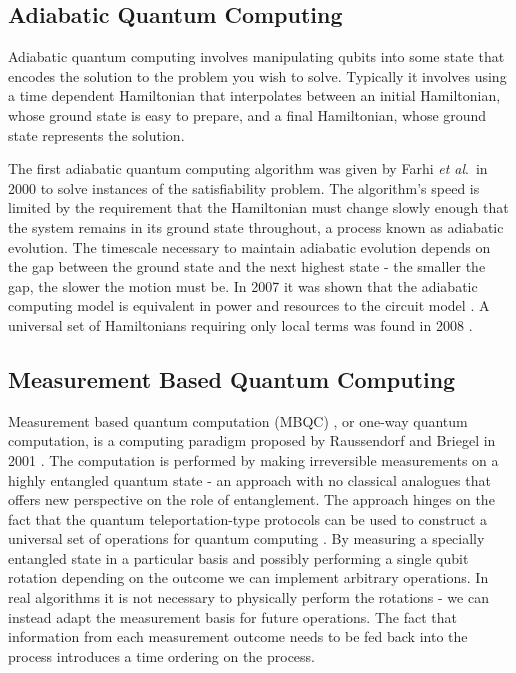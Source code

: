 \subsection{Adiabatic Quantum Computing}

Adiabatic quantum computing involves manipulating qubits into some state that encodes the solution to the problem you wish to solve. Typically it involves using a time dependent Hamiltonian that interpolates between an initial Hamiltonian, whose ground state is easy to prepare, and a final Hamiltonian, whose ground state represents the solution. 

The first adiabatic quantum computing algorithm was given by Farhi \textit{et al}.\ in 2000 \cite{adiabatic_qc} to solve instances of the satisfiability problem. The algorithm's speed is limited by the requirement that the Hamiltonian must change slowly enough that the system remains in its ground state throughout, a process known as adiabatic evolution. The timescale necessary to maintain adiabatic evolution depends on the gap between the ground state and the next highest state - the smaller the gap, the slower the motion must be. In 2007 it was shown that the adiabatic computing model is equivalent in power and resources to the circuit model \cite{adiabatic_equivalent}. A universal set of Hamiltonians requiring only local terms was found in 2008 \cite{hamiltonians_for_adiabatic_qc}.


\subsection{Measurement Based Quantum Computing}\label{MBQC}

Measurement based quantum computation (MBQC) \cite{mbqc_intro}, or one-way quantum computation, is a computing paradigm proposed by Raussendorf and Briegel in 2001 \cite{one_way_qc}.
The computation is performed by making irreversible measurements on a highly entangled quantum state - an approach with no classical analogues that offers new perspective on the role of entanglement.
The approach hinges on the fact that the quantum teleportation-type protocols can be used to construct a universal set of operations for quantum computing \cite{teleportation_universal}. By measuring a specially entangled state in a particular basis and possibly performing a single qubit rotation depending on the outcome we can implement arbitrary operations. In real algorithms it is not necessary to physically perform the rotations - we can instead adapt the measurement basis for future operations. The fact that information from each measurement outcome needs to be fed back into the process introduces a time ordering on the process. 

